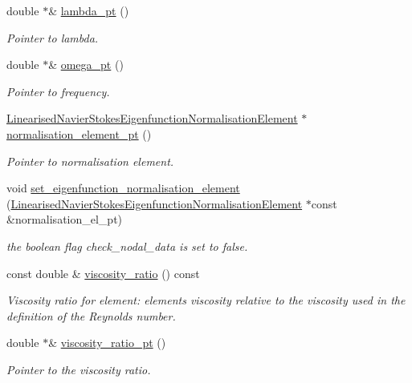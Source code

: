 \begin{DoxyCompactItemize}
double $\ast$\& \hyperlink{classoomph_1_1LinearisedNavierStokesEquations_a13e7b6a51c6e395851dc291f46890c8a}{lambda\+\_\+pt} ()
\begin{DoxyCompactList}\small\item\em Pointer to lambda. \end{DoxyCompactList}\item 
double $\ast$\& \hyperlink{classoomph_1_1LinearisedNavierStokesEquations_a533ad8fff1ae8872b56796137f07ad0f}{omega\+\_\+pt} ()
\begin{DoxyCompactList}\small\item\em Pointer to frequency. \end{DoxyCompactList}\item 
\hyperlink{classoomph_1_1LinearisedNavierStokesEigenfunctionNormalisationElement}{Linearised\+Navier\+Stokes\+Eigenfunction\+Normalisation\+Element} $\ast$ \hyperlink{classoomph_1_1LinearisedNavierStokesEquations_a1cef1075a508e74bd56ecc643021e10c}{normalisation\+\_\+element\+\_\+pt} ()
\begin{DoxyCompactList}\small\item\em Pointer to normalisation element. \end{DoxyCompactList}\item 
void \hyperlink{classoomph_1_1LinearisedNavierStokesEquations_a6de14f26f9d832d344fa9916d835f40d}{set\+\_\+eigenfunction\+\_\+normalisation\+\_\+element} (\hyperlink{classoomph_1_1LinearisedNavierStokesEigenfunctionNormalisationElement}{Linearised\+Navier\+Stokes\+Eigenfunction\+Normalisation\+Element} $\ast$const \&normalisation\+\_\+el\+\_\+pt)
\begin{DoxyCompactList}\small\item\em the boolean flag check\+\_\+nodal\+\_\+data is set to false. \end{DoxyCompactList}\item 
const double \& \hyperlink{classoomph_1_1LinearisedNavierStokesEquations_ad2b1cfccb77277173df8711f8be7a7e7}{viscosity\+\_\+ratio} () const
\begin{DoxyCompactList}\small\item\em Viscosity ratio for element\+: element\textquotesingle{}s viscosity relative to the viscosity used in the definition of the Reynolds number. \end{DoxyCompactList}\item 
double $\ast$\& \hyperlink{classoomph_1_1LinearisedNavierStokesEquations_aa74c9a1061c77f49cfba75ae93fe5c2b}{viscosity\+\_\+ratio\+\_\+pt} ()
\begin{DoxyCompactList}\small\item\em Pointer to the viscosity ratio. \end{DoxyCompactList}\item 

\end{DoxyCompactItemize}
